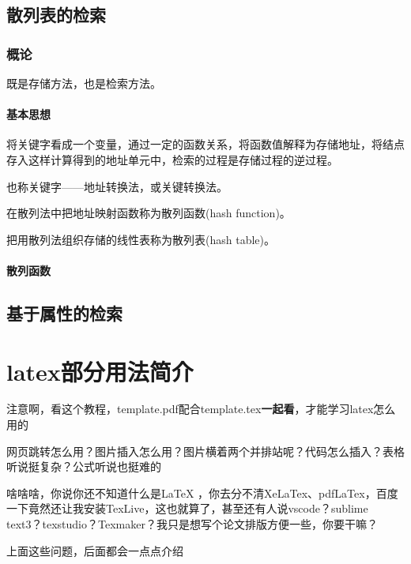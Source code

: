 \documentclass[AutoFakeBold]{LZUThesis2007}
\begin{document}
	\section{散列表的检索}
		\subsection{概论}
		既是存储方法，也是检索方法。
			\subsubsection{基本思想}
			将关键字看成一个变量，通过一定的函数关系，将函数值解释为存储地址，将结点存入这样计算得到的地址单元中，检索的过程是存储过程的逆过程。

			也称关键字——地址转换法，或关键转换法。

			在散列法中把地址映射函数称为散列函数(hash function)。

			把用散列法组织存储的线性表称为散列表(hash table)。
			\subsubsection{散列函数}
			
		\section{基于属性的检索}

















\chapter{latex部分用法简介}

注意啊，看这个教程，template.pdf配合template.tex\textbf{一起看}，才能学习latex怎么用的

网页跳转怎么用？图片插入怎么用？图片横着两个并排站呢？代码怎么插入？表格听说挺复杂？公式听说也挺难的

啥啥啥，你说你还不知道什么是LaTeX ，你去分不清XeLaTex、pdfLaTex，百度一下竟然还让我安装TexLive，这也就算了，甚至还有人说vscode？sublime text3？texstudio？Texmaker？我只是想写个论文排版方便一些，你要干嘛？

上面这些问题，后面都会一点点介绍
\end{document}
